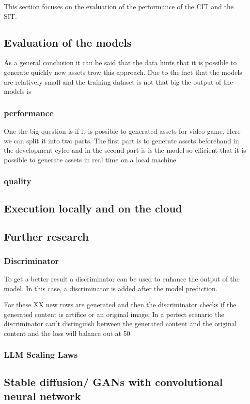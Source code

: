
This section focuses on the evaluation of the performance of the CIT and the SIT.

\subsection{Evaluation of the models}
    
    As a general conclusion it can be said that the data hints that it is possible to generate quickly new assets trow this approach. Due to the fact that the models are relatively small and the training dataset is not that big the output of the models is 

    \subsubsection{performance}
    One the big question is if it is possible to generated assets for video game. Here we can split it into two parts. The first part is to generate assets beforehand in the development cylce and in the second part is is the model so efficient that it is possible to generate assets in real time on a local machine.

    \subsubsection{quality}


\subsection{Execution locally and on the cloud}
    
    

\subsection{Further research}

    \subsubsection{Discriminator}
    To get a better result a discriminator can be used to enhance the output of the model. In this case, a discriminator is added after the model prediction.

    For these XX new rows are generated and then the discriminator checks if the generated content is artifice or an original image. In a perfect scenario the discriminator can't distinguish between the generated content and the original content and the loss will balance out at 50

    \subsubsection{LLM Scaling Laws}


    \subsection{Stable diffusion/ GANs with convolutional neural network}